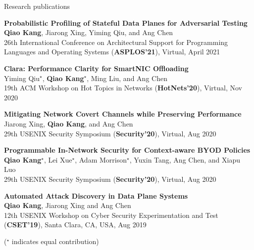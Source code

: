 \documentclass{resume} %
\begin{document}
\begin{rSection}{Research publications}


\item {\bf Probabilistic Profiling of Stateful Data Planes for Adversarial Testing}\\
{\bf Qiao Kang}, Jiarong Xing, Yiming Qiu, and Ang Chen \\
26th International Conference on Architectural Support for Programming Languages and Operating Systems ({\bf ASPLOS'21}), Virtual, April 2021

\vspace{3mm}

\item {\bf Clara: Performance Clarity for SmartNIC Offloading}\\
Yiming Qiu$^\star$, {\bf Qiao Kang$^\star$}, Ming Liu, and Ang Chen \\
19th ACM Workshop on Hot Topics in Networks ({\bf HotNets'20}), Virtual, Nov 2020

\vspace{3mm}

\item {\bf Mitigating Network Covert Channels while Preserving Performance}\\
Jiarong Xing, {\bf Qiao Kang}, and Ang Chen\\
29th USENIX Security Symposium ({\bf Security'20}), Virtual, Aug 2020

\vspace{3mm}

\item {\bf Programmable In-Network Security for Context-aware BYOD Policies}\\
{\bf Qiao Kang$^\star$}, Lei Xue$^\star$, Adam Morrison$^\star$, Yuxin Tang, Ang Chen, and Xiapu Luo\\
29th USENIX Security Symposium ({\bf Security'20}), Virtual, Aug 2020

\vspace{3mm}

\item {\bf Automated Attack Discovery in Data Plane Systems}\\
{\bf Qiao Kang}, Jiarong Xing and Ang Chen\\
12th USENIX Workshop on Cyber Security Experimentation and Test ({\bf CSET'19}), Santa Clara, CA, USA, Aug 2019

\vspace{1mm}

($^\star$ indicates equal contribution)

\vspace{2mm}

\end{rSection}
\end{document}

